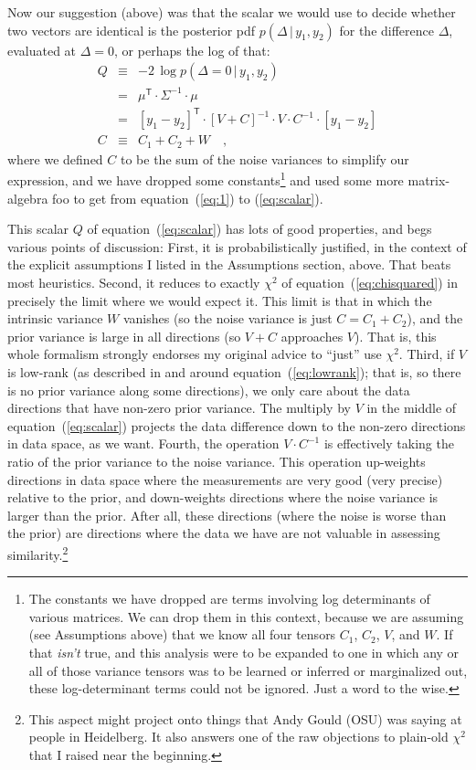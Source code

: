 \documentclass[12pt,letterpaper]{article}
\newcommand{\equationname}{equation}
\newcommand{\tra}[1]{{#1}^{\mathsf{T}}}
\newcommand{\inv}[1]{{#1}^{-1}}
\newcommand{\given}{\,|\,}
\begin{document}
Now our suggestion (above) was that the scalar we would use to decide
whether two vectors are identical is the posterior pdf $p(\Delta\given
y_1,y_2)$ for the difference $\Delta$, evaluated at $\Delta=0$, or
perhaps the log of that:
\begin{eqnarray}
  Q &\equiv& -2\,\log p(\Delta=0\given y_1,y_2)
\\
    &=& \tra{\mu}\cdot\inv{\Sigma}\cdot\mu
\label{eq:1}\\
    &=& \tra{[y_1-y_2]}\cdot\inv{[V + C]}\cdot V\cdot\inv{C}\cdot[y_1-y_2]
\label{eq:scalar} \\
  C &\equiv& C_1 + C_2 + W
\quad ,
\end{eqnarray}
where we defined $C$ to be the sum of the noise variances to simplify
our expression, and we have dropped some constants\footnote{The
  constants we have dropped are terms involving log determinants of
  various matrices. We can drop them in this context, because we are
  assuming (see Assumptions above) that we know all four tensors
  $C_1$, $C_2$, $V$, and $W$. If that \emph{isn't} true, and this
  analysis were to be expanded to one in which any or all of those
  variance tensors was to be learned or inferred or marginalized out,
  these log-determinant terms could not be ignored. Just a word to the
  wise.} and used some more matrix-algebra foo to get from
  \equationname~(\ref{eq:1}) to (\ref{eq:scalar}).

This scalar $Q$ of \equationname~(\ref{eq:scalar}) has lots of good properties,
and begs various points of discussion:
First, it is probabilistically justified, in the context of the explicit
assumptions I listed in the Assumptions section, above. That beats most
heuristics.
Second, it reduces to exactly $\chi^2$ of \equationname~(\ref{eq:chisquared}) in
precisely the limit where we would expect it. This limit is that in which the
intrinsic variance $W$ vanishes (so the noise variance is just $C = C_1 + C_2$), and the prior
variance is large in all directions (so $V + C$ approaches $V$).
That is, this whole formalism strongly endorses my original advice to ``just''
use $\chi^2$.
Third, if $V$ is low-rank (as described in and around
\equationname~(\ref{eq:lowrank}); that is, so there is no prior
variance along some directions), we only care about the data
directions that have non-zero prior variance. The multiply by $V$ in
the middle of \equationname~(\ref{eq:scalar}) projects the data
difference down to the non-zero directions in data space, as we want.
Fourth, the operation $V\cdot\inv{C}$ is effectively taking the ratio
of the prior variance to the noise variance. This operation up-weights
directions in data space where the measurements are very good (very
precise) relative to the prior, and down-weights directions where the
noise variance is larger than the prior. After all, these directions
(where the noise is worse than the prior) are directions where the
data we have are not valuable in assessing similarity.\footnote{This
  aspect might project onto things that Andy Gould (OSU) was saying at
  people in Heidelberg. It also answers one of the raw objections to
  plain-old $\chi^2$ that I raised near the beginning.}
\end{document}
